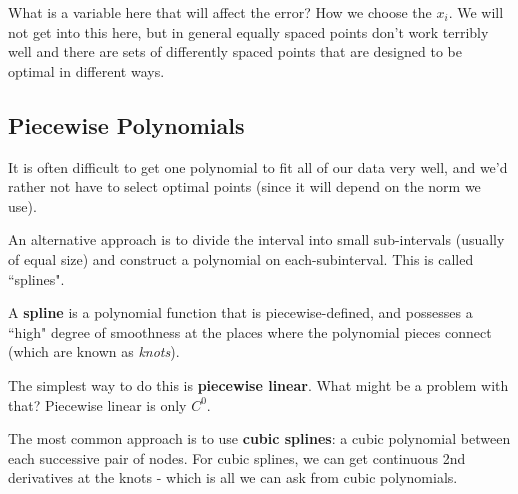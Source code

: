 \documentclass[12pt]{article}
\begin{document}
What is a variable here that will affect the error? How we choose the $x_i$. We will not get into this here, but in general equally spaced points don't work terribly well and there are sets of differently spaced points that are designed to be optimal in different ways. 

\subsection{Piecewise Polynomials}

It is often difficult to get one polynomial to fit all of our data very well, and we'd rather not have to select optimal points (since it will depend on the norm we use). 

An alternative approach is to divide the interval into small sub-intervals (usually of equal size) and construct a polynomial on each-subinterval. This is called ``splines".

%
%
%
%
%
A \textbf{spline} is a polynomial function that is piecewise-defined, and possesses a ``high" degree of smoothness at the places where the polynomial pieces connect (which are known as \textit{knots}).


The simplest way to do this is \textbf{piecewise linear}. What might be a problem with that? Piecewise linear is only $C^0$.

The most common approach is to use \textbf{cubic splines}: a cubic polynomial between each successive pair of nodes. For cubic splines, we can get continuous 2nd derivatives at the knots - which is all we can ask from cubic polynomials. 
\end{document}
